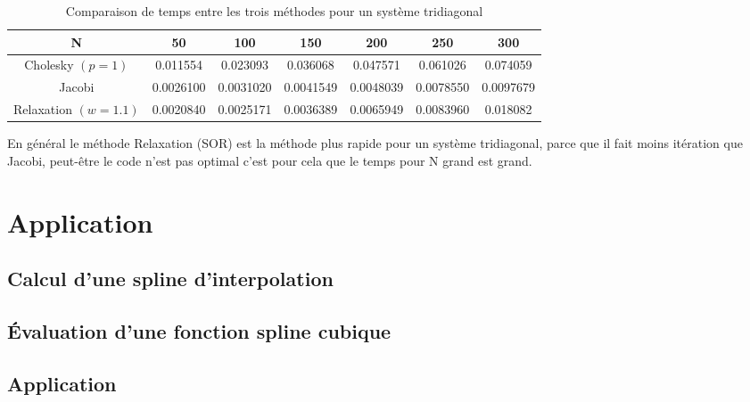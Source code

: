 \documentclass[a4paper,11pt]{article}
\begin{document}
\begin{table}[h!]
  \begin{center}
    \begin{tabular}{|c|c|c|c|c|c|c|}
      \hline 
      N & 50 & 100 & 150 & 200 & 250 & 300 \\
      \hline 
      \hline 
      Cholesky $(p=1)$ & 0.011554       &  0.023093 & 0.036068
      & 0.047571 & 0.061026 & 0.074059 \\
      Jacobi &   0.0026100
      &    0.0031020
      &   0.0041549
      &   0.0048039
      &  0.0078550
      &  0.0097679        \\
      Relaxation $(w = 1.1)$
      &  0.0020840
      &  0.0025171
      & 0.0036389 
      & 0.0065949
      & 0.0083960
      & 0.018082\\
      \hline 
    \end{tabular}
  \end{center}
  \caption{Comparaison de temps entre les trois méthodes pour un système tridiagonal}
\end{table}

En général le méthode Relaxation (SOR) est la méthode plus rapide pour un
système tridiagonal, parce que il  fait moins itération que Jacobi, peut-être le
code n'est pas optimal c'est pour cela que le temps pour N grand est grand.

\section{Application}
\subsection{Calcul d'une spline d'interpolation}
\begin{multicols}{2}
  
\end{multicols}

\subsection{Évaluation d'une fonction spline cubique}


\begin{multicols}{2}
  
\end{multicols}

\subsection{Application}
\end{document}
